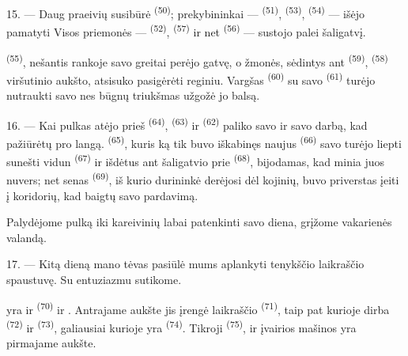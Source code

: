 15. --- Daug praeivių susibūrė  \textsuperscript{(50)};
prekybininkai ---  \textsuperscript{(51)},  \textsuperscript{(53)},  \textsuperscript{(54)} ---
išėjo pamatyti  Visos priemonės --- 
\textsuperscript{(52)},  \textsuperscript{(57)} ir net
 \textsuperscript{(56)} --- sustojo palei šaligatvį.

\VUsaut{3.0mm}

 \textsuperscript{(55)}, nešantis rankoje savo
 greitai perėjo gatvę, o žmonės, sėdintys ant
 \textsuperscript{(59)},  \textsuperscript{(58)}
viršutinio aukšto, atsisuko pasigėrėti reginiu. Vargšas  \textsuperscript{(60)} su savo  \textsuperscript{(61)} turėjo
nutraukti savo  nes būgnų triukšmas užgožė jo balsą.

16. --- Kai pulkas atėjo prieš  \textsuperscript{(64)},
 \textsuperscript{(63)} ir  \textsuperscript{(62)}
paliko savo  ir savo darbą, kad pažiūrėtų pro langą.
 \textsuperscript{(65)}, kuris ką tik buvo iškabinęs naujus
 \textsuperscript{(66)} savo  turėjo liepti sunešti
vidun  \textsuperscript{(67)} ir  išdėtus ant
šaligatvio prie  \textsuperscript{(68)}, bijodamas, kad
minia juos nuvers; net senas  \textsuperscript{(69)}, iš
kurio durininkė derėjosi dėl kojinių, buvo priverstas įeiti į koridorių, kad baigtų
savo pardavimą.

Palydėjome pulką iki kareivinių  labai patenkinti savo diena, grįžome
vakarienės valandą.

\VUsaut{3.0mm}

17. --- Kitą dieną mano tėvas pasiūlė mums aplankyti tenykščio laikraščio spaustuvę.
Su entuziazmu sutikome.

 yra ir  \textsuperscript{(70)}
   ir
. Antrajame aukšte jis įrengė laikraščio 
\textsuperscript{(71)}, taip pat  kurioje dirba
 \textsuperscript{(72)} ir 
\textsuperscript{(73)}, galiausiai  kurioje yra  \textsuperscript{(74)}. Tikroji 
\textsuperscript{(75)},  ir įvairios mašinos yra pirmajame
aukšte.


